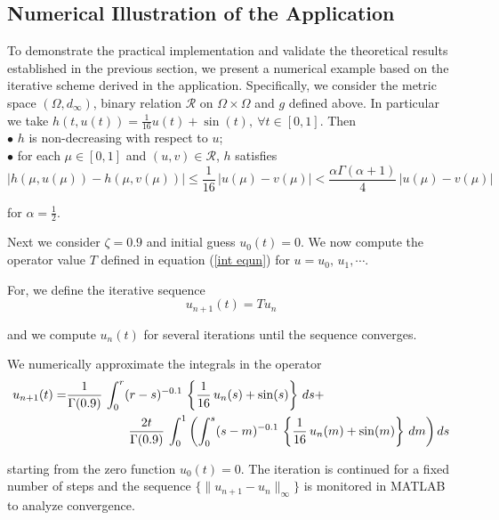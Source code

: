 \documentclass[10pt, reqno]{amsart}
\theoremstyle{definition}
\theoremstyle{remark}
\numberwithin{equation}{section}
\begin{document}
\subsection{Numerical Illustration of the Application}

\hspace{0.2cm}

To demonstrate the practical implementation and validate the theoretical results established in the previous section, we present a numerical example based on the iterative scheme derived in the application. Specifically, we consider the metric space   $ (\Omega , d_\infty )  $,   binary relation $ \mathcal{R} $ on $ \Omega \times \Omega $  and  $   g $ defined above. In particular we take $ h( t, u(t ) ) =  \frac{1}{16} u (t ) + \sin (t ), ~ \forall t \in [ 0, 1 ] $. Then \\
$\bullet $ $  h $ is     non-decreasing with respect to  $ u $; \\
$\bullet $  for each $ \mu \in [ 0, 1 ] $ and $ ( u, v ) \in \mathcal{R} $, $ h $ satisfies 
$$ | h ( \mu, u ( \mu ) ) - h ( \mu, v ( \mu ) ) | \leq \frac{1}{16} \, | u ( \mu ) - v( \mu ) | <  \frac{\alpha \Gamma ( \alpha + 1 ) }{4} \, | u ( \mu ) - v( \mu ) |  $$

for $ \alpha  = \frac{1}{2} $.  

Next we consider $ \zeta = 0.9 $ and initial guess $ u_0 ( t ) = 0 $. We now compute the operator value $T$ defined in equation (\ref{int equn})   for $ u = u_0, \, u_1, \cdots $. 

For, we define the iterative sequence 
$$ u_{n+1} ( t )= T u_n $$

and we compute $ u_n ( t ) $ for several iterations until the sequence converges. 


We numerically approximate the integrals in the operator
\begin{align*}
	u_{n+1} ( t )  = & \dfrac{1}{\Gamma ( 0.9 )} \, \int_{0}^{r} ( r - s)^{  - 0.1} \, \left\{ \frac{1}{16} \, u_n (s )  + \sin (s ) \right\} \,  ds + \\
	& \hskip 50 pt 	\dfrac{2 t }{\Gamma ( 0.9 )} \, \int_{0}^{1}  \left( \int_{0}^{s} ( s - m)^{  - 0.1}  \, \left\{ \frac{1}{16} \, u_n (m ) + \sin (m ) \right\}  \,  dm    \right) ds
\end{align*} 	 

starting from the zero function $ u_0  (t)=0 $. The iteration   is continued for a fixed number of steps  and the sequence \( \{ \| u_{n+1} - u_n \|_\infty \} \) is monitored in MATLAB  to analyze convergence.  
\end{document}
